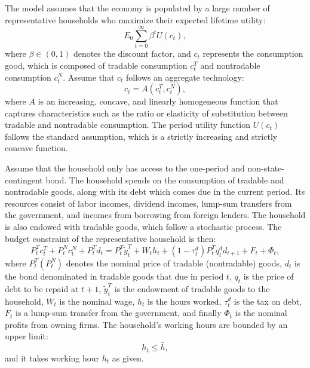 The model assumes that the economy is populated by a large number of representative households who maximize their expected lifetime utility:
\begin{equation}
    \label{eq:utility}
    E_0 \sum_{t=0}^\infty \beta^t U(c_t),
\end{equation}
where $\beta \in(0,1)$ denotes the discount factor,
and $c_t$ represents the consumption good, which is composed of
tradable consumption $c_t^T$ and nontradable consumption $c_t^N$.
Assume that $c_t$ follows an aggregate technology:
\begin{equation}
    \label{eq:A}
    c_t = A(c^T_t, c^N_t),
\end{equation}
where $A$ is an increasing, concave, and linearly homogeneous function that captures characteristics such as the ratio or elasticity of substitution between tradable and nontradable consumption.
The period utility function $U(c_t)$ follows the standard assumption, which is a strictly increasing and strictly concave function.

Assume that the household only has access to the one-period and non-state-contingent bond.
The household spends on the consumption of tradable and nontradable goods, along with its debt which comes due in the current period. Its resources consist of labor incomes, dividend incomes, lump-sum transfers from the government, and incomes from borrowing from foreign lenders. The household is also endowed with tradable goods, which follow a stochastic process.
The budget constraint of the representative household is then:
\begin{equation}
    \label{eq:bc}
    P^T_t c^T_t + P^N_t c^N_t + P^T_t d_t =
    P^T_t \tilde{y}^T_t + W_t h_t + (1- \tau^d_t)P^T_t q^d_t d_{t+1} + F_t + \Phi_t,
\end{equation}
where $P^T_t (P^N_t)$ denotes the nominal price of tradable (nontradable) goods, $d_t$ is the bond denominated in tradable goods that due in period $t$, $q_t$ is the price of debt to be repaid at $t+1$, $\tilde{y}^T_t$ is the endowment of tradable goods to the household, $W_t$ is the nominal wage, $h_t$ is the hours worked, $\tau^d_t$ is the tax on debt, $F_t$ is a lump-sum transfer from the government, and finally $\Phi_t$ is the nominal profits from owning firms.
The household's working hours are bounded by an upper limit:
\begin{equation}
    \label{eq:h-constraint}
    h_t \le \bar{h},
\end{equation}
and it takes working hour $h_t$ as given.

